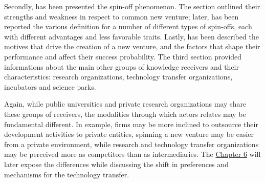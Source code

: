 Secondly, has been presented the spin-off phenomenon. The section outlined their strengths and weakness in respect to common new venture; later, has been reported the various definition for a number of different types of spin-offs, each with different advantages and less favorable traits. Lastly, has been described the motives that drive the creation of a new venture, and the factors that shape their performance and affect their success probability. The third section provided informations about the main other groups of knowledge receivers and their characteristics: research organizations, technology transfer organizations, incubators and science parks. 

Again, while public universities and private research organizations may share these groups of receivers, the modalities through which actors relates may be fundamental different. In example, firms may be more inclined to outsource their development activities to private entities, spinning a new venture may be easier from a private environment, while research and technology transfer organizations may be perceived more as competitors than as intermediaries. The \hyperref[Chapter6]{Chapter 6} will later expose the differences while discussing the shift in preferences and mechanisms for the technology transfer. 